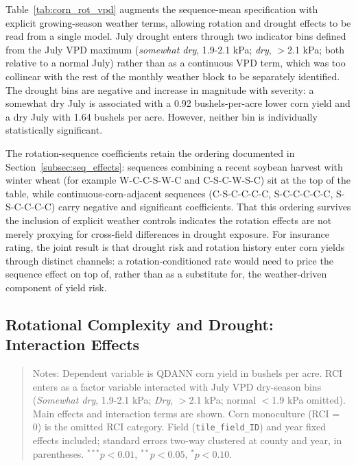 \documentclass[12pt,letterpaper]{article}
\theoremstyle{remark}
\theoremstyle{remark}
\theoremstyle{plain}
\theoremstyle{definition}
\begin{document}
Table~\ref{tab:corn_rot_vpd} augments the sequence-mean specification with explicit growing-season weather terms, allowing rotation and drought effects to be read from a single model. July drought enters through two indicator bins defined from the July VPD maximum (\emph{somewhat dry}, 1.9-2.1 kPa; \emph{dry}, $>$2.1 kPa; both relative to a normal July) rather than as a continuous VPD term, which was too collinear with the rest of the monthly weather block to be separately identified. The drought bins are negative and increase in magnitude with severity: a somewhat dry July is associated with a 0.92 bushels-per-acre lower corn yield and a dry July with 1.64 bushels per acre. However, neither bin is individually statistically significant.

The rotation-sequence coefficients retain the ordering documented in Section~\ref{subsec:seq_effects}: sequences combining a recent soybean harvest with winter wheat (for example W-C-C-S-W-C and C-S-C-W-S-C) sit at the top of the table, while continuous-corn-adjacent sequences (C-S-C-C-C-C, S-C-C-C-C-C, S-S-C-C-C-C) carry negative and significant coefficients. That this ordering survives the inclusion of explicit weather controls indicates the rotation effects are not merely proxying for cross-field differences in drought exposure. For insurance rating, the joint result is that drought risk and rotation history enter corn yields through distinct channels: a rotation-conditioned rate would need to price the sequence effect on top of, rather than as a substitute for, the weather-driven component of yield risk.

\subsection{\label{subsec:rci_vpd_effects}Rotational Complexity and Drought: Interaction Effects}


\begin{quote}
\small
Notes: Dependent variable is QDANN corn yield in bushels per acre. RCI enters as
a factor variable interacted with July VPD dry-season bins (\emph{Somewhat dry},
1.9-2.1 kPa; \emph{Dry}, $>$2.1 kPa; normal $<$1.9 kPa omitted). Main effects
and interaction terms are shown. Corn monoculture (RCI = 0) is the omitted RCI
category. Field (\texttt{tile\_field\_ID}) and year fixed effects included;
standard errors two-way clustered at county and year, in parentheses.
$^{***}p<0.01$, $^{**}p<0.05$, $^{*}p<0.10$.
\end{quote}
\end{document}
